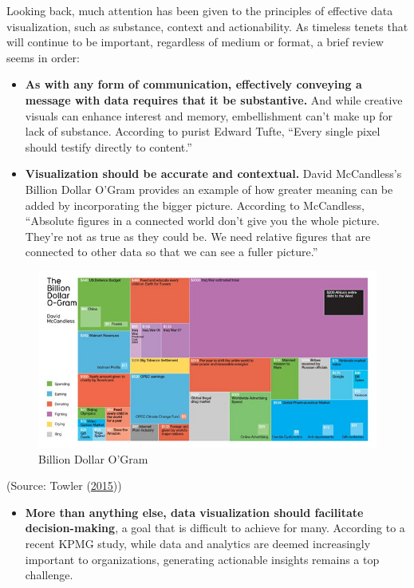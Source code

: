 \documentclass[]{book}
\providecommand{\tightlist}{%
  \setlength{\itemsep}{0pt}\setlength{\parskip}{0pt}}
\begin{document}
Looking back, much attention has been given to the principles of
effective data visualization, such as substance, context and
actionability. As timeless tenets that will continue to be important,
regardless of medium or format, a brief review seems in order:

\begin{itemize}
\item
  \textbf{As with any form of communication, effectively conveying a
  message with data requires that it be substantive.} And while creative
  visuals can enhance interest and memory, embellishment can't make up
  for lack of substance. According to purist Edward Tufte, ``Every
  single pixel should testify directly to content.''
\item
  \textbf{Visualization should be accurate and contextual.} David
  McCandless's Billion Dollar O'Gram provides an example of how greater
  meaning can be added by incorporating the bigger picture. According to
  McCandless, ``Absolute figures in a connected world don't give you the
  whole picture. They're not as true as they could be. We need relative
  figures that are connected to other data so that we can see a fuller
  picture.''
\end{itemize}

\begin{figure}
\centering
\includegraphics{images/BillionDollar.jpg}
\caption{Billion Dollar O'Gram}
\end{figure}

(Source: Towler (\protect\hyperlink{ref-future_viz}{2015}))

\begin{itemize}
\tightlist
\item
  \textbf{More than anything else, data visualization should facilitate
  decision-making}, a goal that is difficult to achieve for many.
  According to a recent KPMG study, while data and analytics are deemed
  increasingly important to organizations, generating actionable
  insights remains a top challenge.
\end{itemize}
\end{document}
